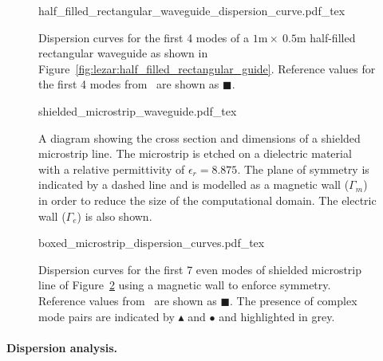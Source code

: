 \begin{figure}
\bwfig
 \centering
  \def\svgwidth{\largefig}
  {half_filled_rectangular_waveguide_dispersion_curve.pdf_tex}
 \caption{Dispersion curves for the first 4 modes of a
 $1\text{m}\times~0.5\text{m}$ half-filled rectangular waveguide as shown
 in Figure~\ref{fig:lezar:half_filled_rectangular_guide}. Reference values
 for the first 4 modes from~\citet{Jin2002} are shown as $\blacksquare$.}
 \label{fig:lezar:half_loaded_rectangular_dispersion_curves}
\end{figure}

\begin{figure}
\bwfig
        \centering
    \def\svgwidth{\smallfig}
    {shielded_microstrip_waveguide.pdf_tex}
    \caption{A diagram showing the cross section and dimensions of a
    shielded microstrip line. The microstrip is etched on a dielectric
    material with a relative permittivity of $\epsilon_r = 8.875$. The
    plane of symmetry is indicated by a dashed line and is modelled
    as a magnetic wall ($\Gamma_m$) in order to reduce the size of the
    computational domain. The electric wall ($\Gamma_e$) is also shown.}
    \label{fig:lezar:shielded_microstrip}
\end{figure}\clearpage

\begin{figure}
\bwfig
 \centering
  \def\svgwidth{\largefig}
    {boxed_microstrip_dispersion_curves.pdf_tex}
 \caption{Dispersion curves for the first 7 even modes of shielded
 microstrip line of Figure~\ref{fig:lezar:shielded_microstrip}
 using a magnetic wall to enforce symmetry. Reference values
 from~\citet{PelosiCoccioliSelleri1998} are shown as $\blacksquare$. The
 presence of complex mode pairs are indicated by $\blacktriangle$ and
 $\bullet$ and highlighted in grey.}
 \label{fig:lezar:shielded_microstrip_dispersion_curves}
\end{figure}
\label{lezar:sec:shielded_microstrip|)}

\paragraph{Dispersion analysis.}

